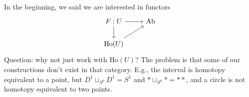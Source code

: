\documentclass[12pt]{article}
\theoremstyle{definition}
\begin{document}
	In the beginning, we said we are interested in functors 
	$$\begin{tikzcd}
	F:U \arrow[r] \arrow[d] & \text{Ab} \\
	\text{Ho}(U) \arrow[ru] &          
	\end{tikzcd}$$ 
	Question: why not just work with $\text{Ho}(U)$? The problem is that some of our constructions don't exist in that category. E.g., the interval is homotopy equivalent to a point, but $D^{1}\sqcup_{S^{0}}D^{1}=S^{1}$ and $*\sqcup_{S^{0}}*=**$, and a circle is not homotopy equivalent to two points. 
	
	
	
	
	
	
	
	
	
\end{document}
